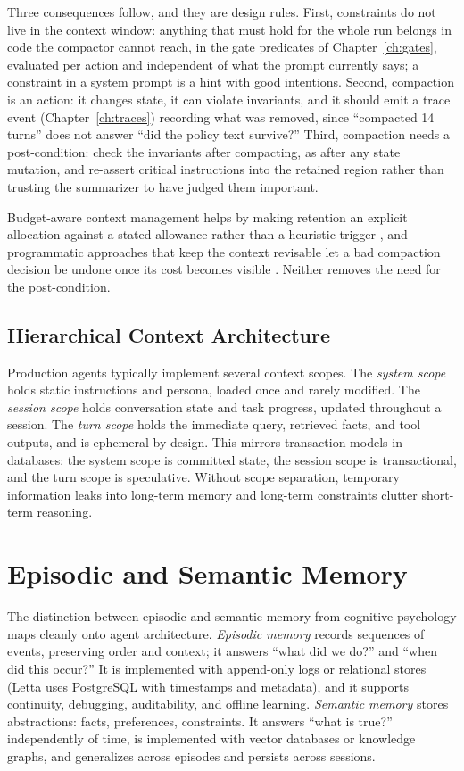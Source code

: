 \documentclass[11pt]{book}
\begin{document}
Three consequences follow, and they are design rules. First, constraints do not live in the context window: anything that must hold for the whole run belongs in code the compactor cannot reach, in the gate predicates of Chapter~\ref{ch:gates}, evaluated per action and independent of what the prompt currently says; a constraint in a system prompt is a hint with good intentions. Second, compaction is an action: it changes state, it can violate invariants, and it should emit a trace event (Chapter~\ref{ch:traces}) recording what was removed, since ``compacted 14 turns'' does not answer ``did the policy text survive?'' Third, compaction needs a post-condition: check the invariants after compacting, as after any state mutation, and re-assert critical instructions into the retained region rather than trusting the summarizer to have judged them important.

Budget-aware context management helps by making retention an explicit allocation against a stated allowance rather than a heuristic trigger \cite{contextbudget2026}, and programmatic approaches that keep the context revisable let a bad compaction decision be undone once its cost becomes visible \cite{contextenv2026, acmgmt2026}. Neither removes the need for the post-condition.

\subsection{Hierarchical Context Architecture}

Production agents typically implement several context scopes. The \textit{system scope} holds static instructions and persona, loaded once and rarely modified. The \textit{session scope} holds conversation state and task progress, updated throughout a session. The \textit{turn scope} holds the immediate query, retrieved facts, and tool outputs, and is ephemeral by design. This mirrors transaction models in databases: the system scope is committed state, the session scope is transactional, and the turn scope is speculative. Without scope separation, temporary information leaks into long-term memory and long-term constraints clutter short-term reasoning.

\section{Episodic and Semantic Memory}

The distinction between episodic and semantic memory from cognitive psychology maps cleanly onto agent architecture. \textit{Episodic memory} records sequences of events, preserving order and context; it answers ``what did we do?'' and ``when did this occur?'' It is implemented with append-only logs or relational stores (Letta uses PostgreSQL with timestamps and metadata), and it supports continuity, debugging, auditability, and offline learning. \textit{Semantic memory} stores abstractions: facts, preferences, constraints. It answers ``what is true?'' independently of time, is implemented with vector databases or knowledge graphs, and generalizes across episodes and persists across sessions.
\end{document}
